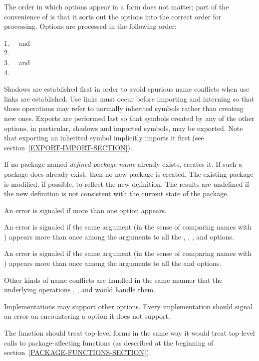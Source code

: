 \begin{new}
\begin{defmac}
The order in which options appear in a  form does not matter;
part of the convenience of  is that it sorts out the options
into the correct order for processing.
Options are processed in the following order:
\begin{tabbing}
1.~~ and  \\
2.~~ \\
3.~~ and  \\
4.~~
\end{tabbing}
Shadows are established first in order to avoid spurious name conflicts
when use links are established.  Use links must occur before importing
and interning so that those operations may refer to normally inherited
symbols rather than creating new ones.  Exports are performed last so that
symbols created by any of the other options, in particular,
shadows and imported symbols, may be exported.  Note that exporting an
inherited symbol implicitly imports it first
(see section~\ref{EXPORT-IMPORT-SECTION}).

If no package named \emph{defined-package-name} already exists,
 creates it.  If such a package does already exist,
then no new package is created.  The existing package is
modified, if possible, to reflect the new definition.  The results are
undefined if the new definition is not consistent with the current
state of the package.

An error is signaled if more than one  option appears.

An error is signaled if the same  argument (in the sense
of comparing names with ) appears more than once among
the arguments to all the , ,
, and  options.

An error is signaled if the same  argument (in the sense
of comparing names with ) appears more than once among
the arguments to all the  and  options.

Other kinds of name conflicts are handled in the same manner that
the underlying operations , , and 
would handle them.

Implementations may support other  options.
Every implementation should signal an error on encountering
a  option it does not support.

The function  should treat top-level 
forms in the same way it would treat top-level calls to package-affecting
functions (as described at the beginning of
section~\ref{PACKAGE-FUNCTIONS-SECTION}).


\end{defmac}
\end{new}
